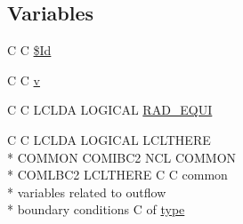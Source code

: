 \subsection*{Variables}
\begin{DoxyCompactItemize}
\item 
C C \hyperlink{ibc2_8com_af40bd3a96fc1553c00422342f92046b8}{\$\-Id}
\item 
C C \hyperlink{ibc2_8com_a8961853e9a171af64fe80e35da93a2e0}{v}
\item 
C C L\-C\-L\-D\-A L\-O\-G\-I\-C\-A\-L \hyperlink{ibc2_8com_a5e52771773c3d7155ccec9942c9d7d87}{R\-A\-D\-\_\-\-E\-Q\-U\-I}
\item 
C C L\-C\-L\-D\-A L\-O\-G\-I\-C\-A\-L L\-C\-L\-T\-H\-E\-R\-E \\*
C\-O\-M\-M\-O\-N C\-O\-M\-I\-B\-C2 N\-C\-L C\-O\-M\-M\-O\-N \\*
C\-O\-M\-L\-B\-C2 L\-C\-L\-T\-H\-E\-R\-E C C common \\*
variables related to outflow \\*
boundary conditions C of \hyperlink{ibc2_8com_a2b68f0032c5a5129886c29c634a37223}{type}
\end{DoxyCompactItemize}


